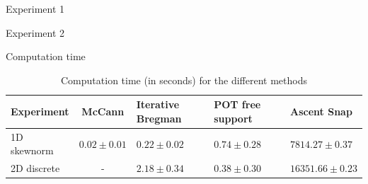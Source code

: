 \begin{frame}{Experiment 1}
\end{frame}

\begin{frame}{Experiment 2}
    
\end{frame}

\begin{frame}{Computation time}
    \begin{table}
        \begin{center}
            \begin{tabularx}{\textwidth}{>{\raggedright}m{2cm} c m{2cm} X X}
                    Experiment & McCann & Iterative Bregman & POT free support & Ascent Snap \\
                    \hline\hline
                    1D skewnorm & $0.02 \pm 0.01$ & $0.22 \pm 0.02$ & $0.74 \pm 0.28$ & $7814.27 \pm 0.37$ \\
                    2D discrete & - & $2.18 \pm 0.34$ & $0.38 \pm 0.30$ & $16351.66 \pm 0.23$ \\
            \end{tabularx}
        \end{center}
        \caption{Computation time (in seconds) for the different methods}
    \end{table}
\end{frame}

